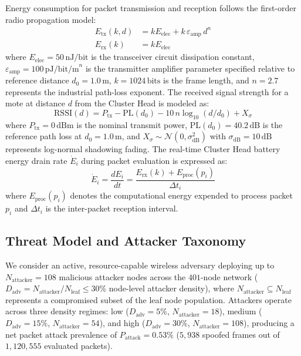 \documentclass[conference]{IEEEtran}
\begin{document}
Energy consumption for packet transmission and reception follows the first-order radio propagation model:
\begin{align}
E_\text{tx}(k,d) &= k E_\text{elec} + k\,\varepsilon_\text{amp}\,d^n \label{eq:etx} \\[2pt]
E_\text{rx}(k) &= k E_\text{elec} \label{eq:erx}
\end{align}
where $E_\text{elec} = 50\,\text{nJ/bit}$ is the transceiver circuit dissipation constant, $\varepsilon_\text{amp} = 100\,\text{pJ/bit/m}^n$ is the transmitter amplifier parameter specified relative to reference distance $d_0 = 1.0\,\text{m}$, $k = 1024\,\text{bits}$ is the frame length, and $n = 2.7$ represents the industrial path-loss exponent. The received signal strength for a mote at distance $d$ from the Cluster Head is modeled as:
\begin{equation}
\text{RSSI}(d) = P_\text{tx} - \text{PL}(d_0) - 10 \, n \log_{10}(d/d_0) + X_\sigma
\label{eq:pathloss}
\end{equation}
where $P_\text{tx} = 0\,\text{dBm}$ is the nominal transmit power, $\text{PL}(d_0) = 40.2\,\text{dB}$ is the reference path loss at $d_0 = 1.0\,\text{m}$, and $X_\sigma \sim \mathcal{N}(0, \sigma_\text{dB}^2)$ with $\sigma_\text{dB} = 10\,\text{dB}$ represents log-normal shadowing fading. The real-time Cluster Head battery energy drain rate $\dot{E}_i$ during packet evaluation is expressed as:
\begin{equation}
\dot{E}_i = \frac{dE_i}{dt} = \frac{E_\text{rx}(k) + E_\text{proc}(p_i)}{\Delta t_i}
\label{eq:battery_drain}
\end{equation}
where $E_\text{proc}(p_i)$ denotes the computational energy expended to process packet $p_i$ and $\Delta t_i$ is the inter-packet reception interval.

\subsection{Threat Model and Attacker Taxonomy}
We consider an active, resource-capable wireless adversary deploying up to $N_\text{attacker} = 108$ malicious attacker nodes across the $401$-node network ($D_\text{adv} = N_\text{attacker}/N_\text{leaf} \le 30\%$ node-level attacker density), where $N_\text{attacker} \subseteq N_\text{leaf}$ represents a compromised subset of the leaf node population. Attackers operate across three density regimes: low ($D_\text{adv}=5\%$, $N_\text{attacker}=18$), medium ($D_\text{adv}=15\%$, $N_\text{attacker}=54$), and high ($D_\text{adv}=30\%$, $N_\text{attacker}=108$), producing a net packet attack prevalence of $P_\text{attack} = 0.53\%$ ($5{,}938$ spoofed frames out of $1{,}120{,}555$ evaluated packets).
\end{document}
